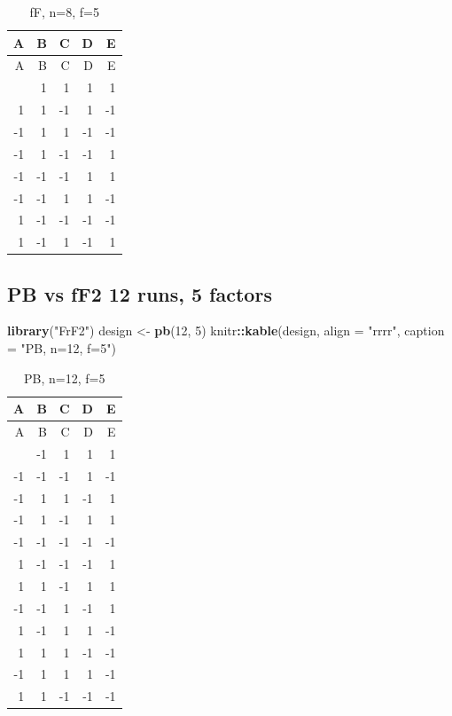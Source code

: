 \documentclass[
  12pt,
  a4paper,
]{article}
\newenvironment{Shaded}{\begin{snugshade}}{\end{snugshade}}
\newcommand{\AttributeTok}[1]{\textcolor[rgb]{0.13,0.29,0.53}{#1}}
\newcommand{\DecValTok}[1]{\textcolor[rgb]{0.00,0.00,0.81}{#1}}
\newcommand{\FunctionTok}[1]{\textcolor[rgb]{0.13,0.29,0.53}{\textbf{#1}}}
\newcommand{\NormalTok}[1]{#1}
\newcommand{\OtherTok}[1]{\textcolor[rgb]{0.56,0.35,0.01}{#1}}
\newcommand{\SpecialCharTok}[1]{\textcolor[rgb]{0.81,0.36,0.00}{\textbf{#1}}}
\newcommand{\StringTok}[1]{\textcolor[rgb]{0.31,0.60,0.02}{#1}}
\numberwithin{equation}{section}
\theoremstyle{plain}
\theoremstyle{definition}
\theoremstyle{remark}
\theoremstyle{note}
\begin{document}
\begin{longtable}[]{@{}rrrrr@{}}
\caption{fF, n=8, f=5}\tabularnewline
\toprule\noalign{}
A & B & C & D & E \\
\midrule\noalign{}
\endfirsthead
\toprule\noalign{}
A & B & C & D & E \\
\midrule\noalign{}
\endhead
\bottomrule\noalign{}
\endlastfoot
1 & 1 & 1 & 1 & 1 \\
1 & 1 & -1 & 1 & -1 \\
-1 & 1 & 1 & -1 & -1 \\
-1 & 1 & -1 & -1 & 1 \\
-1 & -1 & -1 & 1 & 1 \\
-1 & -1 & 1 & 1 & -1 \\
1 & -1 & -1 & -1 & -1 \\
1 & -1 & 1 & -1 & 1 \\
\end{longtable}

\newpage

\hypertarget{pb-vs-ff2-12-runs-5-factors}{%
\subsection{PB vs fF2 12 runs, 5
factors}\label{pb-vs-ff2-12-runs-5-factors}}

\begin{Shaded}
\begin{Highlighting}[]
\FunctionTok{library}\NormalTok{(}\StringTok{"FrF2"}\NormalTok{)}
\NormalTok{design }\OtherTok{\textless{}{-}} \FunctionTok{pb}\NormalTok{(}\DecValTok{12}\NormalTok{, }\DecValTok{5}\NormalTok{)}
\NormalTok{knitr}\SpecialCharTok{::}\FunctionTok{kable}\NormalTok{(design, }\AttributeTok{align =} \StringTok{"rrrr"}\NormalTok{, }\AttributeTok{caption =} \StringTok{"PB, n=12, f=5"}\NormalTok{)}
\end{Highlighting}
\end{Shaded}

\begin{longtable}[]{@{}rrrrr@{}}
\caption{PB, n=12, f=5}\tabularnewline
\toprule\noalign{}
A & B & C & D & E \\
\midrule\noalign{}
\endfirsthead
\toprule\noalign{}
A & B & C & D & E \\
\midrule\noalign{}
\endhead
\bottomrule\noalign{}
\endlastfoot
1 & -1 & 1 & 1 & 1 \\
-1 & -1 & -1 & 1 & -1 \\
-1 & 1 & 1 & -1 & 1 \\
-1 & 1 & -1 & 1 & 1 \\
-1 & -1 & -1 & -1 & -1 \\
1 & -1 & -1 & -1 & 1 \\
1 & 1 & -1 & 1 & 1 \\
-1 & -1 & 1 & -1 & 1 \\
1 & -1 & 1 & 1 & -1 \\
1 & 1 & 1 & -1 & -1 \\
-1 & 1 & 1 & 1 & -1 \\
1 & 1 & -1 & -1 & -1 \\
\end{longtable}
\end{document}
